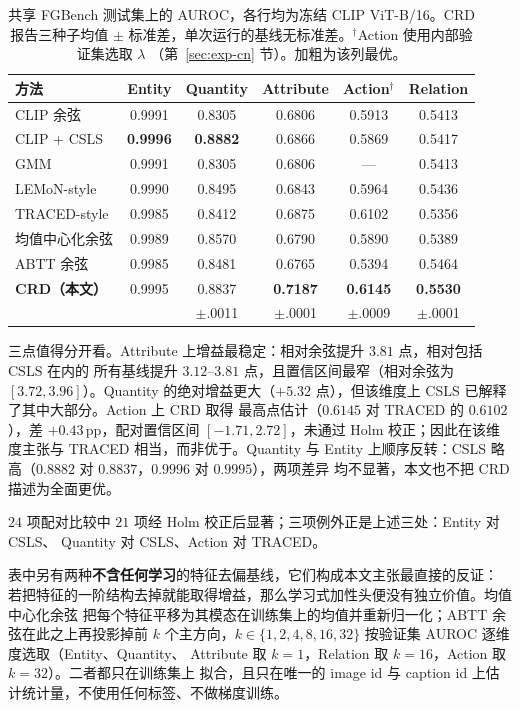 \documentclass[10pt,twocolumn,a4paper]{ctexart}
\begin{document}
\begin{table}[t]
\centering
\small
\setlength{\tabcolsep}{14pt}
\caption{共享 FGBench 测试集上的 AUROC，各行均为冻结 CLIP ViT-B/16。CRD 报告三种子均值
$\pm$ 标准差，单次运行的基线无标准差。$^\dagger$Action 使用内部验证集选取 $\lambda$
（第~\ref{sec:exp-cn} 节）。加粗为该列最优。}
\label{tab:main-cn}
\begin{tabular}{lccccc}
\toprule
方法 & Entity & Quantity & Attribute & Action$^\dagger$ & Relation \\
\midrule
CLIP 余弦 & 0.9991 & 0.8305 & 0.6806 & 0.5913 & 0.5413 \\
CLIP + CSLS & \textbf{0.9996} & \textbf{0.8882} & 0.6866 & 0.5869 & 0.5417 \\
GMM & 0.9991 & 0.8305 & 0.6806 & --- & 0.5413 \\
LEMoN-style & 0.9990 & 0.8495 & 0.6843 & 0.5964 & 0.5436 \\
TRACED-style & 0.9985 & 0.8412 & 0.6875 & 0.6102 & 0.5356 \\
均值中心化余弦 & 0.9989 & 0.8570 & 0.6790 & 0.5890 & 0.5389 \\
ABTT 余弦 & 0.9985 & 0.8481 & 0.6765 & 0.5394 & 0.5464 \\
\textbf{CRD（本文）} & 0.9995 & 0.8837 & \textbf{0.7187} & \textbf{0.6145} & \textbf{0.5530} \\
 & & \scriptsize$\pm$.0011 & \scriptsize$\pm$.0001 & \scriptsize$\pm$.0009 & \scriptsize$\pm$.0001 \\
\bottomrule
\end{tabular}
\end{table}

三点值得分开看。Attribute 上增益最稳定：相对余弦提升 $3.81$ 点，相对包括 CSLS 在内的
所有基线提升 $3.12$–$3.81$ 点，且置信区间最窄（相对余弦为 $[3.72,3.96]$）。Quantity
的绝对增益更大（$+5.32$ 点），但该维度上 CSLS 已解释了其中大部分。Action 上 CRD 取得
最高点估计（$0.6145$ 对 TRACED 的 $0.6102$），差 $+0.43$\,pp，配对置信区间
$[-1.71,2.72]$，未通过 Holm 校正；因此在该维度主张与 TRACED 相当，而非优于。Quantity
与 Entity 上顺序反转：CSLS 略高（$0.8882$ 对 $0.8837$，$0.9996$ 对 $0.9995$），两项差异
均不显著，本文也不把 CRD 描述为全面更优。

$24$ 项配对比较中 $21$ 项经 Holm 校正后显著；三项例外正是上述三处：Entity 对 CSLS、
Quantity 对 CSLS、Action 对 TRACED。

表中另有两种\textbf{不含任何学习}的特征去偏基线，它们构成本文主张最直接的反证：
若把特征的一阶结构去掉就能取得增益，那么学习式加性头便没有独立价值。均值中心化余弦
把每个特征平移为其模态在训练集上的均值并重新归一化；ABTT 余弦在此之上再投影掉前 $k$
个主方向，$k\in\{1,2,4,8,16,32\}$ 按验证集 AUROC 逐维度选取（Entity、Quantity、
Attribute 取 $k{=}1$，Relation 取 $k{=}16$，Action 取 $k{=}32$）。二者都只在训练集上
拟合，且只在唯一的 image id 与 caption id 上估计统计量，不使用任何标签、不做梯度训练。
\end{document}
